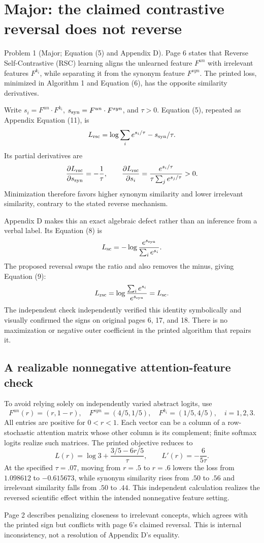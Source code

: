 \documentclass[10pt]{article}
\begin{document}
\section*{Major: the claimed contrastive reversal does not reverse}
Problem 1 (Major; Equation (5) and Appendix D).  Page 6 states that Reverse Self-Contrastive (RSC) learning aligns the unlearned feature \(F^{un}\) with irrelevant features \(F^{k_i}\), while separating it from the synonym feature \(F^{syn}\). The printed loss, minimized in Algorithm 1 and Equation (6), has the opposite similarity derivatives.\par
Write \(s_i=F^{un}\cdot F^{k_i}\), \(s_{\rm syn}=F^{un}\cdot F^{syn}\), and \(\tau>0\). Equation (5), repeated as Appendix Equation (11), is \[L_{\rm rsc}
 =\log\sum_i e^{s_i/\tau}-s_{\rm syn}/\tau.\] Its partial derivatives are \[\frac{\partial L_{\rm rsc}}{\partial s_{\rm syn}}=-\frac1\tau,
 \qquad
 \frac{\partial L_{\rm rsc}}{\partial s_i}
 =\frac{e^{s_i/\tau}}{\tau\sum_j e^{s_j/\tau}}>0.\] Minimization therefore favors higher synonym similarity and lower irrelevant similarity, contrary to the stated reverse mechanism.\par
Appendix D makes this an exact algebraic defect rather than an inference from a verbal label. Its Equation (8) is \[L_{\rm sc}=-\log\frac{e^{s_{\rm syn}}}{\sum_i e^{s_i}}.\] The proposed reversal swaps the ratio and also removes the minus, giving Equation (9): \[L_{\rm rsc}=\log\frac{\sum_i e^{s_i}}{e^{s_{\rm syn}}}
 =L_{\rm sc}.\] The independent check independently verified this identity symbolically and visually confirmed the signs on original pages 6, 17, and 18. There is no maximization or negative outer coefficient in the printed algorithm that repairs it.\par
\subsection*{A realizable nonnegative attention-feature check}
To avoid relying solely on independently varied abstract logits, use \[F^{un}(r)=(r,1-r),\quad
 F^{syn}=(4/5,1/5),\quad
 F^{k_i}=(1/5,4/5),\quad i=1,2,3.\] All entries are positive for \(0<r<1\). Each vector can be a column of a row-stochastic attention matrix whose other column is its complement; finite softmax logits realize such matrices. The printed objective reduces to \[L(r)=\log3+\frac{3/5-6r/5}{\tau},
 \qquad L'(r)=-\frac6{5\tau}.\] At the specified \(\tau=.07\), moving from \(r=.5\) to \(r=.6\) lowers the loss from \(1.098612\) to \(-0.615673\), while synonym similarity rises from \(.50\) to \(.56\) and irrelevant similarity falls from \(.50\) to \(.44\). This independent calculation realizes the reversed scientific effect within the intended nonnegative feature setting.\par
Page 2 describes penalizing closeness to irrelevant concepts, which agrees with the printed sign but conflicts with page 6’s claimed reversal. This is internal inconsistency, not a resolution of Appendix D’s equality.\par
\end{document}
